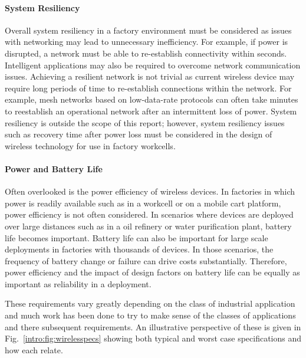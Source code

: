 \paragraph{System Resiliency}
Overall system resiliency in a factory environment must be considered as issues with networking may lead to unnecessary inefficiency. For example, if power is disrupted, a network must be able to re-establish connectivity within seconds. Intelligent applications may also be required to overcome network communication issues. Achieving a resilient network is not trivial as current wireless device may require long periods of time to re-establish connections within the network.  For example, mesh networks based on low-data-rate protocols can often take minutes to reestablish an operational network after an intermittent loss of power.  System resiliency is outside the scope of this report; however, system resiliency issues such as recovery time after power loss must be considered in the design of wireless technology for use in factory workcells.

\paragraph{Power and Battery Life}
Often overlooked is the power efficiency of wireless devices.  In factories in which power is readily available such as in a workcell or on a mobile cart platform, power efficiency is not often considered.  In scenarios where devices are deployed over large distances such as in a oil refinery or water purification plant, battery life becomes important.  Battery life can also be important for large scale deployments in factories with thousands of devices.  In those scenarios, the frequency of battery change or failure can drive costs substantially.  Therefore, power efficiency and the impact of design factors on battery life can be equally as important as reliability in a deployment. 


These requirements vary greatly depending on the class of industrial application and much work has been done to try to make sense of the classes of applications and there subsequent requirements.  An illustrative perspective of these is given in Fig.~\ref{intro:fig:wirelesspecs} showing both typical and worst case specifications and how each relate.  


